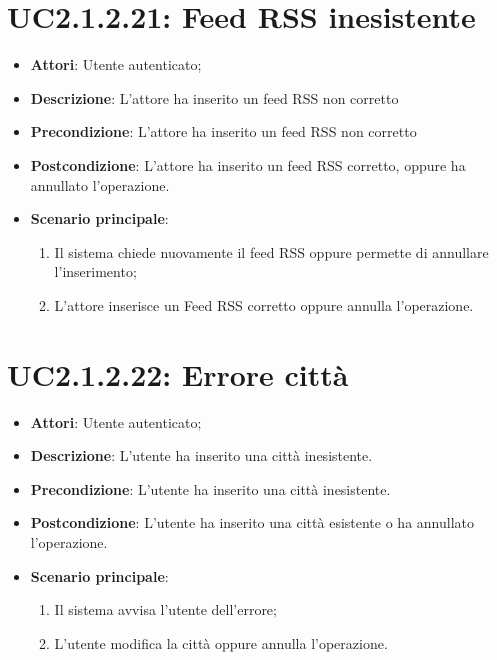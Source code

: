 \section{UC2.1.2.21: Feed RSS inesistente}
\label{UC2.1.2.21}
\begin{itemize}
	\item \textbf{Attori}: Utente autenticato;
	\item \textbf{Descrizione}: L'attore ha inserito un feed RSS non corretto
	\item \textbf{Precondizione}: L'attore ha inserito un feed RSS non corretto
	\item \textbf{Postcondizione}: L'attore ha inserito un feed RSS corretto, oppure ha annullato l'operazione.
	\item \textbf{Scenario principale}:
	\begin{enumerate} \item Il sistema chiede nuovamente il feed RSS oppure permette di annullare l'inserimento;  \item  L'attore inserisce un Feed RSS corretto oppure annulla l'operazione.\end{enumerate}
\end{itemize}

\section{UC2.1.2.22: Errore città }
\label{UC2.1.2.22}
\begin{itemize}
	\item \textbf{Attori}: Utente autenticato;
	\item \textbf{Descrizione}: L'utente ha inserito una città inesistente. 
	\item \textbf{Precondizione}: L'utente ha inserito una città inesistente.
	\item \textbf{Postcondizione}: L'utente ha inserito una città esistente o ha annullato l'operazione.
	\item \textbf{Scenario principale}:
	\begin{enumerate} \item Il sistema avvisa l'utente dell'errore;  \item  L'utente modifica la città oppure annulla l'operazione.\end{enumerate}
\end{itemize}


